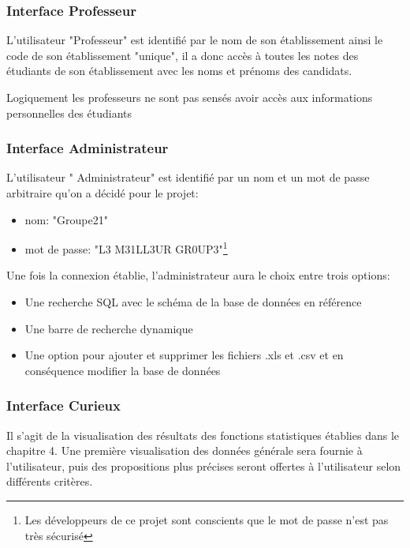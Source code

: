 \subsubsection{Interface Professeur}
L'utilisateur "Professeur" est identifié par le nom de son établissement ainsi le code  de son établissement "unique", il a donc accès à toutes les notes des étudiants de son établissement avec les noms et prénoms des candidats.

Logiquement les professeurs ne sont pas sensés avoir accès aux informations personnelles des étudiants
\subsubsection{Interface Administrateur}
L'utilisateur " Administrateur" est identifié par un nom et un mot de passe arbitraire qu'on a décidé pour le projet: 
\begin{itemize}
         \item nom: "Groupe21"
         \item mot de passe: "L3 M31LL3UR GR0UP3"\footnote{Les développeurs de ce projet sont conscients que le mot de passe n'est pas très sécurisé}
      \end{itemize}
      
      
Une fois la connexion établie, l'administrateur aura le choix entre trois options:
\begin{itemize}
         \item Une recherche SQL avec le schéma de la base de données en référence
         \item Une barre de recherche dynamique
         \item Une option pour ajouter et supprimer les fichiers .xls et .csv et en conséquence modifier la base de données
      \end{itemize}

\subsubsection{Interface Curieux}
Il s'agit de la visualisation des résultats des fonctions statistiques établies dans le chapitre 4. Une première visualisation des données générale sera fournie à l'utilisateur, puis des propositions plus précises seront offertes à l'utilisateur selon différents critères.
